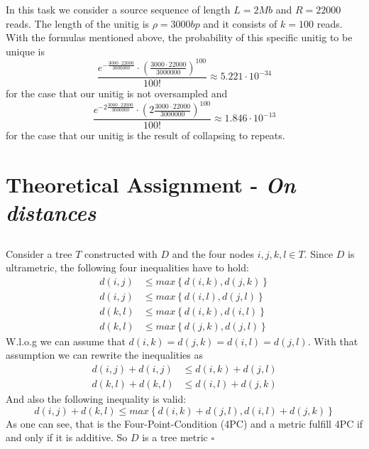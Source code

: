 \documentclass[%
   10pt,              %
   ngerman,           %
   a4paper,           %
   DIV11,             %
]{scrartcl}%
\begin{document}
In this task we consider a source sequence of length $L = 2Mb$ and $R = 22000$ reads. The length of 
the unitig is $\rho = 3000bp$ and it consists of $k = 100$ reads. With the formulas mentioned above, the 
probability of this specific unitig to be unique is
\begin{equation}
 \frac{e^{-\frac{3000 \cdot 22000}{3000000}} \cdot (\frac{3000 \cdot 22000}{3000000})^{100}}{100!} \approx 5.221 \cdot 10^{-34} \nonumber
\end{equation}
for the case that our unitig is not oversampled and 
\begin{equation}
 \frac{e^{-2\frac{3000 \cdot 22000}{3000000}} \cdot (2\frac{3000 \cdot 22000}{3000000})^{100}}{100!} \approx 1.846 \cdot 10^{-13} \nonumber
\end{equation}
for the case that our unitig is the result of collapsing to repeats.



\section{Theoretical Assignment - \textit{On distances}}
\subsection{}

Consider a tree $T$ constructed with $D$ and the four nodes $i,j,k,l \in T$. Since $D$ is ultrametric, 
the following four inequalities have to hold:
\begin{align}
 d(i,j) &\le max \left\lbrace d(i,k), d(j,k) \right\rbrace \nonumber \\
 d(i,j) &\le max \left\lbrace d(i,l), d(j,l) \right\rbrace \nonumber \\
 d(k,l) &\le max \left\lbrace d(i,k), d(i,l) \right\rbrace \nonumber \\
 d(k,l) &\le max \left\lbrace d(j,k), d(j,l) \right\rbrace \nonumber
\end{align}
W.l.o.g we can assume that $d(i,k) = d(j,k) = d(i,l) = d(j,l)$. With that assumption we can rewrite 
the inequalities as
\begin{align}
 d(i,j) + d(i,j) &\le d(i,k) + d(j,l) \nonumber \\
 d(k,l) + d(k,l) &\le d(i,l) + d(j,k) \nonumber
\end{align}
And also the following inequality is valid:
\begin{equation}
 d(i,j) + d(k,l) \le max \left\lbrace d(i,k) + d(j,l), d(i,l) + d(j,k) \right\rbrace \nonumber
\end{equation}
As one can see, that is the Four-Point-Condition (4PC) and a metric fulfill 4PC if and only if it is 
additive. So $D$ is a tree metric $\square$
\end{document}

